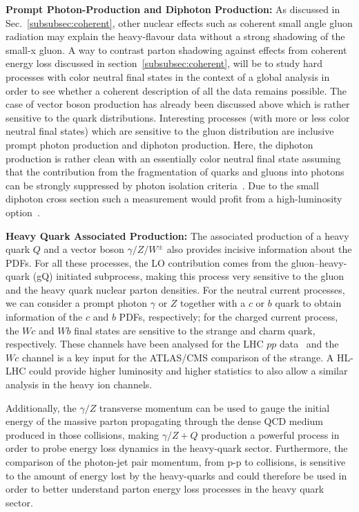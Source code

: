 \documentclass[../report.tex]{subfiles}
\begin{document}
\noindent\textbf{Prompt Photon-Production and Diphoton Production:} 
%
As discussed in Sec.~\ref{subsubsec:coherent}, other nuclear effects such
as coherent small angle gluon radiation may explain the heavy-flavour
data without a strong shadowing of the small-x gluon.  A way to
contrast parton shadowing against effects from coherent energy loss discussed in section~\ref{subsubsec:coherent},
will be to study hard processes with color neutral final states in the
context of a global analysis in order to see whether a coherent
description of all the data remains possible. The case of vector boson
production has already been discussed above which is rather sensitive
to the quark distributions.  Interesting processes (with more or less
color neutral final states) which are sensitive to the gluon
distribution are inclusive prompt photon production and diphoton
production.  Here, the diphoton production is rather clean with an
essentially color neutral final state assuming that the contribution
from the fragmentation of quarks and gluons into photons can be
strongly suppressed by photon isolation criteria~\cite{ATLAS:2017ojy,Acharya:2018dqe}.
Due to the small
diphoton cross section such a measurement would profit from a
high-luminosity option~\cite{Catani:2018krb}. 


\noindent\textbf{Heavy Quark Associated Production:}
%
The associated production of a heavy quark $Q$ and a vector boson $\gamma/Z/W^\pm$ 
also provides incisive information  about the PDFs.  
%
For all these processes, the LO contribution   comes from the gluon--heavy-quark (gQ) initiated
subprocess, making this process very sensitive to the gluon and the heavy quark nuclear parton
densities.
%
For the neutral current processes,  we can consider a prompt photon $\gamma$ or $Z$ together with a
$c$ or $b$ quark to obtain information of the $c$ and $b$ PDFs, respectively; 
for the charged current process, the  $Wc$ and $Wb$ final states are sensitive to the strange and charm quark, respectively. 
%
These channels have been analysed for the LHC $pp$ data~\cite{Dunford:2013lya,Beauchemin:2013cra,Ciaccio:2013rka,Candelise:2015gxa}
and the $Wc$ channel is a key input for the ATLAS/CMS comparison of the strange.\cite{Cooper-Sarkar:2018ufj}
A HL-LHC could provide   higher luminosity and higher statistics to 
also allow  a similar analysis in the heavy  ion channels. 


Additionally, the $\gamma/Z$ transverse momentum can be used to gauge the
initial energy of the massive parton propagating through the dense QCD
medium produced in those collisions, making $\gamma/Z+ Q$ production a
powerful process in order to probe energy loss dynamics in the
heavy-quark sector.  
%
Furthermore, the comparison of the photon-jet pair momentum, from p-p
to \PbPb collisions, is sensitive to the amount of energy lost by the
heavy-quarks and could therefore be used in order to better understand
parton energy loss processes in the heavy quark sector.
\end{document}
